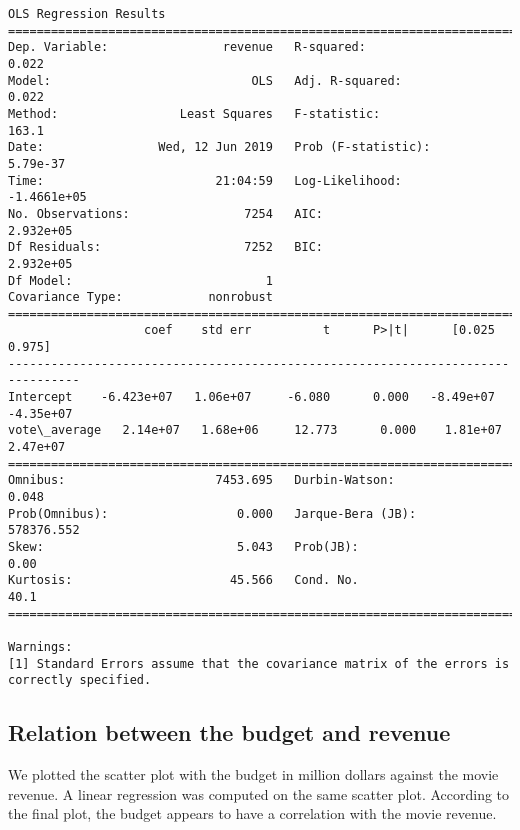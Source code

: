 \documentclass[11pt]{article}
\begin{document}
    \begin{Verbatim}[commandchars=\\\{\}]
                            OLS Regression Results                            
==============================================================================
Dep. Variable:                revenue   R-squared:                       0.022
Model:                            OLS   Adj. R-squared:                  0.022
Method:                 Least Squares   F-statistic:                     163.1
Date:                Wed, 12 Jun 2019   Prob (F-statistic):           5.79e-37
Time:                        21:04:59   Log-Likelihood:            -1.4661e+05
No. Observations:                7254   AIC:                         2.932e+05
Df Residuals:                    7252   BIC:                         2.932e+05
Df Model:                           1                                         
Covariance Type:            nonrobust                                         
================================================================================
                   coef    std err          t      P>|t|      [0.025      0.975]
--------------------------------------------------------------------------------
Intercept    -6.423e+07   1.06e+07     -6.080      0.000   -8.49e+07   -4.35e+07
vote\_average   2.14e+07   1.68e+06     12.773      0.000    1.81e+07    2.47e+07
==============================================================================
Omnibus:                     7453.695   Durbin-Watson:                   0.048
Prob(Omnibus):                  0.000   Jarque-Bera (JB):           578376.552
Skew:                           5.043   Prob(JB):                         0.00
Kurtosis:                      45.566   Cond. No.                         40.1
==============================================================================

Warnings:
[1] Standard Errors assume that the covariance matrix of the errors is correctly specified.

    \end{Verbatim}

    \subsection{Relation between the budget and
revenue}\label{relation-between-the-budget-and-revenue}

    We plotted the scatter plot with the budget in million dollars against
the movie revenue. A linear regression was computed on the same scatter
plot. According to the final plot, the budget appears to have a
correlation with the movie revenue.
\end{document}
